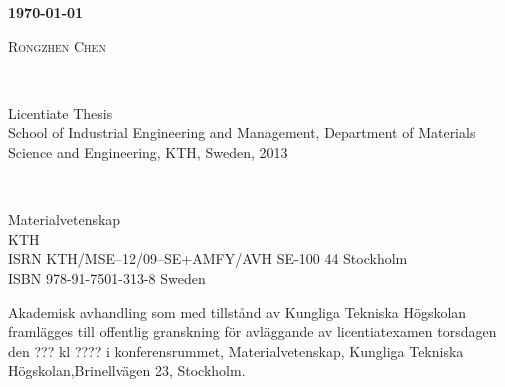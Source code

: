 \documentclass[a4paper, 12pt, titlepage,oneside,drop]{kthesis}
\begin{document}
\setcounter{page}{1}

\begin{center}




  \vspace{5 cm}





  \vspace{12pt}
  \textsc{\LARGE{\textbf{{\today}}}}
  \vspace{12pt}



  \vspace{5 cm}

  \textsc{\large{Rongzhen Chen}}


  \vfill %

  \ %

  \large{Licentiate Thesis}
  \\
  \large{School of Industrial Engineering and Management,
  Department of Materials Science and Engineering,
  KTH, Sweden, 2013}

\end{center}

 \thispagestyle{empty}


\newpage
\setcounter{page}{2}
\thispagestyle{empty}
\
\vfill

\begin{flushright}
 Materialvetenskap\\
 KTH\\
ISRN KTH/MSE--12/09--SE+AMFY/AVH
 \hfill SE-100 44 Stockholm\\ ISBN 978-91-7501-313-8  \hfill
Sweden\\
\end{flushright}


\vspace{5mm}

Akademisk avhandling som med tillstånd av Kungliga Tekniska
Högskolan framlägges till offentlig granskning för avläggande av
licentiatexamen torsdagen den ???\linebreak 2013 kl ???? i
konferensrummet, Materialvetenskap, Kungliga Tekniska
Högskolan,\linebreak Brinellvägen 23, Stockholm.
\end{document}
